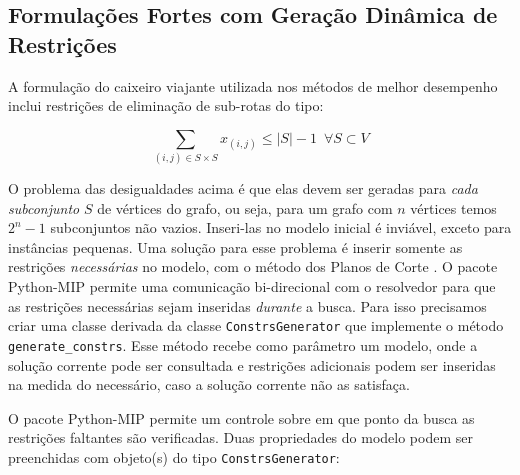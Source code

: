 \documentclass[a4paper,11pt,fleqn]{article}
\begin{document}
\subsection{Formulações Fortes com Geração Dinâmica de Restrições}

A formulação do caixeiro viajante utilizada nos métodos de melhor desempenho inclui restrições de eliminação de sub-rotas do tipo:

\begin{equation}
	\sum_{(i,j) \in S \times S} x_{(i,j)} \leq |S|-1 \,\,\, \forall S \subset V \label{consSubTour}
\end{equation}

O problema das desigualdades acima é que elas devem ser geradas para \emph{cada subconjunto} $S$ de vértices do grafo, ou seja, para um grafo com $n$ vértices temos $2^n-1$ subconjuntos não vazios. 
Inseri-las no modelo inicial é inviável, exceto para instâncias pequenas. 
Uma solução para esse problema é inserir somente as restrições \emph{necessárias} no modelo, com o método dos Planos de Corte \citep{Dantzig54}. 
O pacote Python-MIP permite uma comunicação bi-direcional com o resolvedor para que as restrições necessárias sejam inseridas \emph{durante} a busca. 
Para isso precisamos criar uma classe derivada da classe \texttt{ConstrsGenerator} que implemente o método \texttt{generate\_constrs}. 
Esse método recebe como parâmetro um modelo, onde a solução corrente pode ser consultada e restrições adicionais podem ser inseridas na medida do necessário, caso a solução corrente não as satisfaça. 

O pacote Python-MIP permite um controle sobre em que ponto da busca as restrições faltantes são verificadas. 
Duas propriedades do modelo podem ser preenchidas com objeto(s) do tipo \texttt{ConstrsGenerator}:
\end{document}
